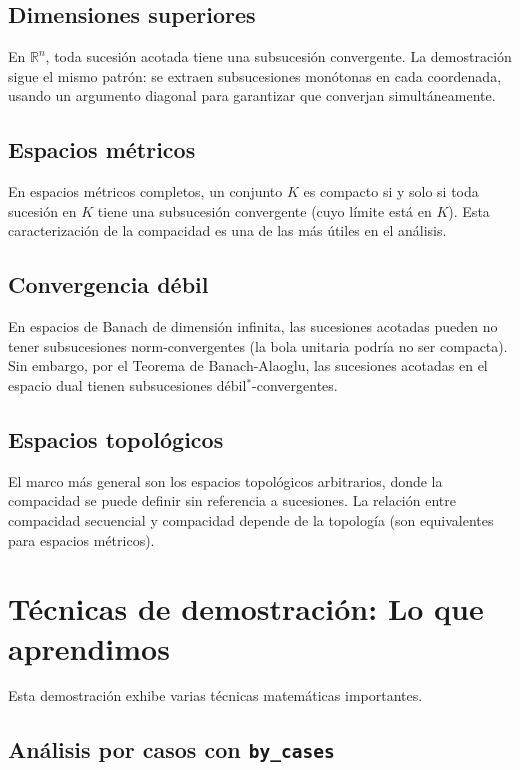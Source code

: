 \subsection{Dimensiones superiores}

En $\mathbb{R}^n$, toda sucesión acotada tiene una subsucesión
convergente. La demostración sigue el mismo patrón: se extraen
subsucesiones monótonas en cada coordenada, usando un argumento diagonal
para garantizar que converjan simultáneamente.

\subsection{Espacios métricos}

En espacios métricos completos, un conjunto $K$ es compacto si y solo si
toda sucesión en $K$ tiene una subsucesión convergente (cuyo límite está
en $K$). Esta caracterización de la compacidad es una de las más útiles
en el análisis.

\subsection{Convergencia débil}

En espacios de Banach de dimensión infinita, las sucesiones acotadas
pueden no tener subsucesiones norm-convergentes (la bola unitaria podría
no ser compacta). Sin embargo, por el Teorema de Banach-Alaoglu, las
sucesiones acotadas en el espacio dual tienen subsucesiones
débil$^*$-convergentes.

\subsection{Espacios topológicos}

El marco más general son los espacios topológicos arbitrarios, donde la
compacidad se puede definir sin referencia a sucesiones. La relación
entre compacidad secuencial y compacidad depende de la topología (son
equivalentes para espacios métricos).

\section{Técnicas de demostración: Lo que aprendimos}

Esta demostración exhibe varias técnicas matemáticas importantes.

\subsection{Análisis por casos con \texttt{by\_cases}}

